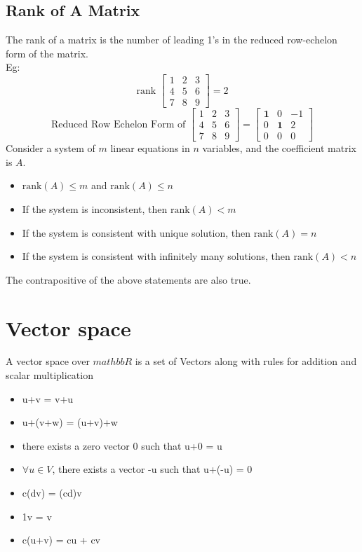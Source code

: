 \documentclass{article}
\begin{document}
\subsection{Rank of A Matrix}
The rank of a matrix is the number of leading 1's in the reduced row-echelon form of the matrix.\\
Eg: \[\text{rank } \begin{bmatrix}
    1 & 2 & 3 \\
    4 & 5 & 6 \\
    7 & 8 & 9
    \end{bmatrix} = 2\]
    \[\text{Reduced Row Echelon Form of } \begin{bmatrix}
        1 & 2 & 3 \\
        4 & 5 & 6 \\
        7 & 8 & 9
        \end{bmatrix} = \begin{bmatrix}
            \textbf{1} & 0 & -1 \\
            0 & \textbf{1} & 2 \\
            0 & 0 & 0
        \end{bmatrix}\]
Consider a system of $m$ linear equations in $n$ variables, and the coefficient matrix is $A$.
        \begin{itemize}
    \item $\text{rank}(A) \le m$ and $\text{rank}(A) \le n$
    \item If the system is inconsistent, then $\text{rank}(A) < m$
    \item If the system is consistent with unique solution, then $\text{rank}(A) = n$
    \item If the system is consistent with infinitely many solutions, then $\text{rank}(A) < n$
\end{itemize}

The contrapositive of the above statements are also true.

\section{Vector space}
A vector space over $mathbb{R}$ is a set of Vectors along with rules for addition and scalar multiplication  

\begin{itemize}
    \item u+v = v+u
    \item u+(v+w) = (u+v)+w
    \item there exists a zero vector 0 such that u+0 = u
    \item $\forall u \in V$, there exists a vector -u such that u+(-u) = 0
    \item c(dv) = (cd)v
    \item 1v = v
    \item c(u+v) = cu + cv 
\end{itemize}
\end{document}
